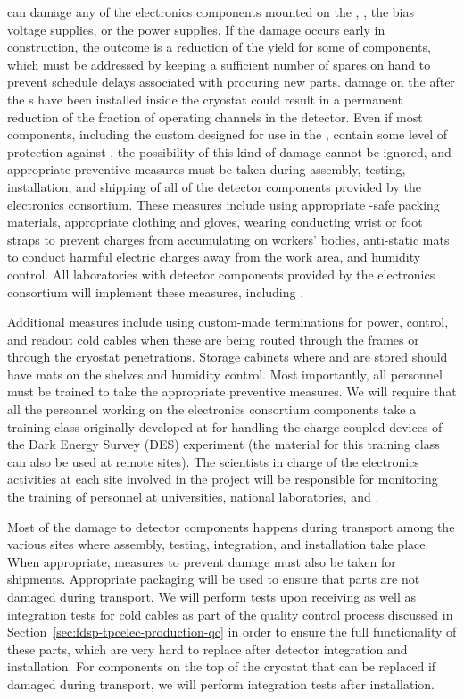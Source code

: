  can damage any of the electronics
components mounted on the , ,
the bias voltage supplies, or the power supplies. If 
the damage occurs early in construction, 
the outcome is a reduction
of the yield for some of components, which must be
addressed by keeping a sufficient number of spares on hand to prevent
schedule delays associated with procuring new parts. 
damage on the  after the s have been
installed inside the cryostat could result in a permanent
reduction of the fraction of operating channels in the
detector. Even if most components, including the custom 
 designed for use in the , contain 
some level of protection  against , the possibility of this kind of damage cannot be ignored, and appropriate 
preventive measures must be taken during  
assembly, testing, installation, and shipping of all of the detector 
components provided by the  electronics consortium. These 
measures include using appropriate -safe packing materials, 
appropriate clothing and gloves, wearing conducting wrist or foot straps 
to prevent charges from accumulating 
on workers' bodies, anti-static mats to conduct harmful electric 
charges away from the work area, and humidity control. All laboratories with detector components provided by the  electronics consortium will implement these
measures, including . 

Additional measures
include using custom-made terminations for 
power, control, and readout cold cables when these
are being routed through the  frames or through the
cryostat penetrations. Storage cabinets where  and
 are stored should have  mats
on the shelves and humidity control. Most importantly, all personnel must be trained to take the appropriate preventive measures. We 
will require that all the personnel working on the  electronics 
consortium components take a training class originally developed 
at  for handling the charge-coupled devices of the Dark Energy Survey (DES) experiment 
(the material for this training class can also be used at remote 
sites). The scientists in charge of the  electronics activities at each site involved in the project will be responsible for monitoring the training of personnel at universities, national laboratories,
and .

Most of the damage to detector components happens during 
transport among the various sites where assembly, testing, integration,
and installation take place. When appropriate, measures to prevent
 damage must also be taken for shipments. Appropriate 
packaging will be used to ensure that parts are not damaged
during transport. We will perform tests upon receiving  
 as well as integration tests for cold cables as
part of the quality control process discussed in 
Section~\ref{sec:fdsp-tpcelec-production-qc} in order to ensure the 
full functionality of these parts, which are very hard to replace 
after detector integration and installation. For  
components on the top of the cryostat that
can be replaced if damaged during transport, we will 
perform integration tests after installation.

